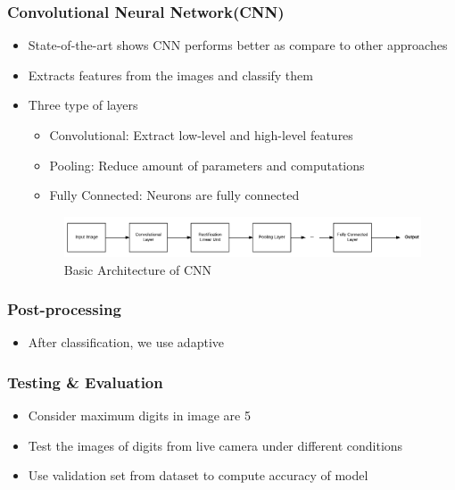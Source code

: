 \documentclass[11.5pt,aspectratio=1610,xcolor={usenames,dvipsnames,table}]{beamer}
\begin{document}
\begin{frame}

\frametitle{Convolutional Neural Network(CNN)}

\begin{itemize}
	\item State-of-the-art shows CNN performs better as compare to other approaches\cite{cnn}
	\item Extracts features from the images and classify them
	\item Three type of layers
		\begin{itemize}
			\item Convolutional: Extract low-level and high-level features
			\item Pooling: Reduce amount of parameters and computations
			\item Fully Connected: Neurons are fully connected
		\end{itemize}	
	\begin{figure}[!h]
		\includegraphics[width=\textwidth]{images/cnn.png}
		\caption{Basic Architecture of CNN }
		
	\end{figure}

\end{itemize}
\end{frame}


\begin{frame}
\frametitle{Post-processing}

\begin{itemize}
	\item After classification, we use adaptive 
\end{itemize}

\end{frame}

\begin{frame}
\frametitle{Testing \& Evaluation}

\begin{itemize}
	\item Consider maximum digits in image are 5
	\item Test the images of digits from live camera under different conditions
	\item Use validation set from dataset to compute accuracy of model
\end{itemize}
\end{frame}
\end{document}
